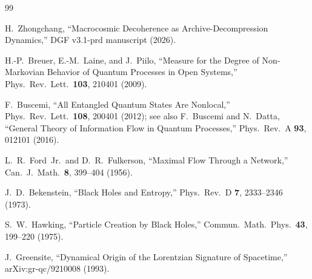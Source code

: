 \documentclass[aps,prd,twocolumn,superscriptaddress,nofootinbib,floatfix]{revtex4-2}
\begin{document}
\begin{thebibliography}{99}

H.~Zhongchang, ``Macrocosmic Decoherence as Archive-Decompression
Dynamics,'' DGF v3.1-prd manuscript (2026).

H.-P.~Breuer, E.-M.~Laine, and J.~Piilo,
``Measure for the Degree of Non-Markovian Behavior of Quantum Processes
in Open Systems,'' Phys.\ Rev.\ Lett.\ \textbf{103}, 210401 (2009).

F.~Buscemi,
``All Entangled Quantum States Are Nonlocal,''
Phys.\ Rev.\ Lett.\ \textbf{108}, 200401 (2012);
see also F.~Buscemi and N.~Datta,
``General Theory of Information Flow in Quantum Processes,''
Phys.\ Rev.\ A \textbf{93}, 012101 (2016).

L.~R.~Ford~Jr.\ and D.~R.~Fulkerson,
``Maximal Flow Through a Network,''
Can.\ J.\ Math.\ \textbf{8}, 399--404 (1956).

J.~D.~Bekenstein,
``Black Holes and Entropy,''
Phys.\ Rev.\ D \textbf{7}, 2333--2346 (1973).

S.~W.~Hawking,
``Particle Creation by Black Holes,''
Commun.\ Math.\ Phys.\ \textbf{43}, 199--220 (1975).

J.~Greensite,
``Dynamical Origin of the Lorentzian Signature of Spacetime,''
arXiv:gr-qc/9210008 (1993).

\end{thebibliography}
\end{document}
